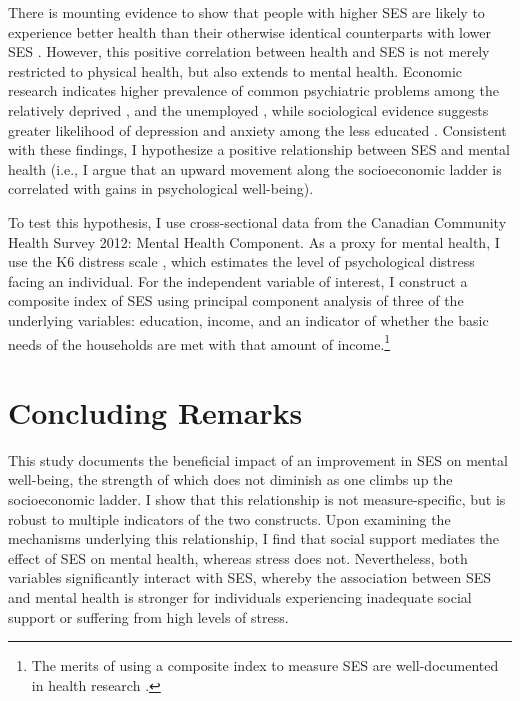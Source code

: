 \documentclass[undefended]{bumrp}
\begin{document}
There is mounting evidence to show that people with higher SES are likely to experience better health than their otherwise identical counterparts with lower SES \cite[][]{Coburn1974,Meyer2014}. However, this positive correlation between health and SES is not merely restricted to physical health, but also extends to mental health. Economic research indicates higher prevalence of common psychiatric problems among the relatively deprived \cite[][]{Wildman2003}, and the unemployed \cite[][]{Wildman2003,Marcus2013}, while sociological evidence suggests greater likelihood of depression and anxiety among the less educated \cite[][]{Miech1999}. Consistent with these findings, I hypothesize a positive relationship between SES and mental health (i.e., I argue that an upward movement along the socioeconomic ladder is correlated with gains in psychological well-being).

To test this hypothesis, I use cross-sectional data from the Canadian Community Health Survey 2012: Mental Health Component. As a proxy for mental health, I use the K6 distress scale \cite[][]{Kessler2002}, which estimates the level of psychological distress facing an individual. For the independent variable of interest, I construct a composite index of SES using principal component analysis of three of the underlying variables: education, income, and an indicator of whether the basic needs of the households are met with that amount of income.\footnote{\scriptsize The merits of using a composite index to measure SES are well-documented in health research \cite[][]{Meyer2014,Braveman2005}.}

\chapter{Concluding Remarks}

This study documents the beneficial impact of an improvement in SES on mental well-being, the strength of which does not diminish as one climbs up the socioeconomic ladder. I show that this relationship is not measure-specific, but is robust to multiple indicators of the two constructs. Upon examining the mechanisms underlying this relationship, I find that social support mediates the effect of SES on mental health, whereas stress does not. Nevertheless, both variables significantly interact with SES, whereby the association between SES and mental health is stronger for individuals experiencing inadequate social support or suffering from high levels of stress.
\end{document}
